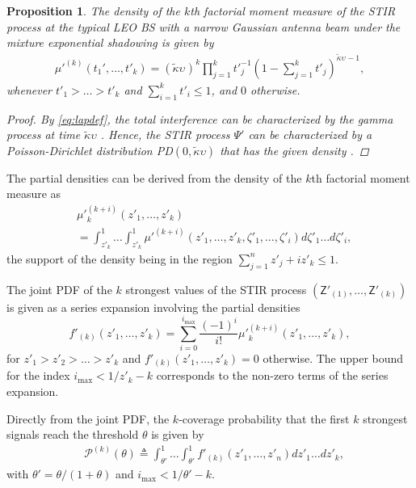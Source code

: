 \documentclass[lettersize,journal]{IEEEtran}
\newtheorem{prop}[theorem]{Proposition}
\begin{document}
\begin{prop}
  The density of the $k$th factorial moment measure \cite[Corollary 10]{7305791} of the STIR process at the typical LEO BS with a narrow Gaussian antenna beam under the mixture exponential shadowing is given by
  \begin{align}
    \label{eq:factorialmoment}
    \mu'^{(k)}(t_1',\dots,t'_k) = (\tilde{\kappa}\upsilon_{})^k\prod_{j=1}^k{t'}_{j}^{-1}\left(1- \sum_{j=1}^kt'_j \right)^{\tilde{\kappa}\upsilon_{}-1},       
  \end{align}
  whenever $t'_1>\dots >t'_k$ and $\sum_{i=1}^k t'_i \leq 1$, and $0$ otherwise.
  \begin{proof}
    By \eqref{eq:lapdef}, the total interference can be characterized by the gamma process at time $\tilde{\kappa}\upsilon$ \cite[Eq. (8)]{pitman1997two}. Hence, the STIR process $\Psi'$ can be characterized by a Poisson-Dirichlet distribution PD$(0,\tilde{\kappa}\upsilon)$ that has the given density \cite[Eq. (2.3)]{handa2009two}.
  \end{proof}
\end{prop}

The partial densities can be derived from the density of the $k$th factorial moment measure as \cite[Eq. (62)]{7305791}
\begin{align}
  \label{eq:auxillary}
  &{\mu'}_k^{(k+i)}(z'_1,\dots,z'_k) \nonumber \\
  &= \int_{z'_k}^1 \dots \int_{z'_k}^1 {\mu'}^{(k+i)}(z'_1,\dots,z'_k,\zeta'_1,\dots,\zeta'_i) d\zeta'_1 \dots d\zeta'_i,
\end{align}
the support of the density being in the region $\sum_{j=1}^nz'_j+iz'_k \leq 1$. 


The joint PDF of the $k$ strongest values of the STIR process $(\mathsf{Z}'_{(1)}, \dots, \mathsf{Z}'_{(k)})$ is given as a series expansion involving the partial densities \cite[Eq. (64)]{7305791}
\begin{equation}
  \label{eq:jointprobability}
  f'_{(k)}(z'_1,\dots,z'_k)= \sum^{i_{\text{max}}}_{i=0}\frac{(-1)^i}{i!}{\mu'}_k^{(k+i)}(z'_1,\dots,z'_k),
\end{equation}
for $z'_1>z'_2>\dots>z'_k$ and $f'_{(k)}(z'_1,\dots,z'_k) =0 $ otherwise. The upper bound for the index $i_{\text{max}}<1/z'_k-k$ corresponds to the non-zero terms of the series expansion. 

Directly from the joint PDF, the $k$-coverage probability that the first $k$ strongest signals reach the threshold $\theta$ is given by
\begin{align}
  \label{eq:kprobability}
  &\mathcal{P}^{(k)}(\theta) \triangleq  \int_{\theta'}^1\dots \int_{\theta'}^1 f'_{(k)}({z'_1},\dots,{z'_n})dz'_1 \dots d{z'_k}, 
\end{align}
with $\theta'=\theta/(1+\theta)$ and $i_{\text{max}}<1/\theta'-k$.
\end{document}
